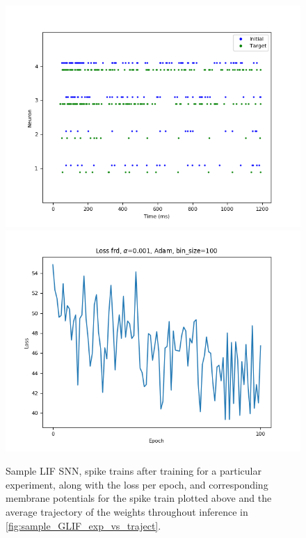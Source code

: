 \documentclass[mphil,deptreport,ianc]{infthesis} %
\begin{document}
\begin{figure}
    \centering
    \vspace{-0.1in}
    \includegraphics[width=0.8\columnwidth]{figures/samples/LIF/12-10_09-55-57-223/spike_trains_train_iter_100.png}
    \includegraphics[width=0.8\columnwidth]{figures/samples/LIF/12-10_09-55-57-223/plot_loss_test12-10_09-56-55-12812-10_09-56-55-128.png}
    \vspace{-0.1in}
    \caption{Sample LIF SNN, spike trains after training for a particular experiment, along with the loss per epoch, and corresponding membrane potentials for the spike train plotted above and the average trajectory of the weights throughout inference in \ref{fig:sample_GLIF_exp_vs_traject}.}
    \label{fig:sample_LIF_exp_spikes_loss}
\end{figure}
\end{document}
